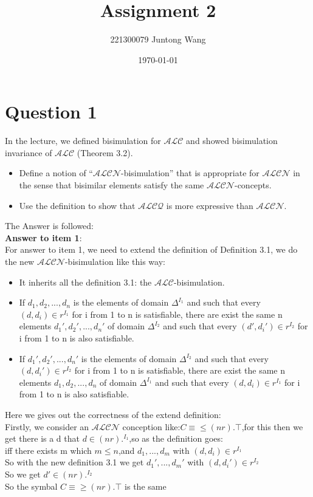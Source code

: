 \documentclass{article}
\title{Assignment 2}
\author{221300079 Juntong Wang}
\date{\today}
\begin{document}
	\maketitle

	\section{Question 1}
    In the lecture, we defined bisimulation for $\mathcal{ALC}$ and showed bisimulation invariance of $\mathcal{ALC}$ (Theorem 3.2).
    \begin{itemize}
        \item Define a notion of ``$\mathcal{ALCN}$-bisimulation'' that is appropriate for $\mathcal{ALCN}$ in the sense that bisimilar elements satisfy the same $\mathcal{ALCN}$-concepts.
        \item Use the definition to show that $\mathcal{ALCQ}$ is more expressive than $\mathcal{ALCN}$.
    \end{itemize}

    The Answer is followed:\\

    \textbf{Answer to item 1}:\\
    For answer to item 1, we need to extend the definition of Definition 3.1, we do the new $\mathcal{ALCN}$-bisimulation like this way:\\
    \begin{itemize}
        \item It inherits all the definition 3.1: the $\mathcal{ALC}$-bisimulation.
        \item If $d_1,d_2,...,d_n$ is the elements of domain $\Delta^{I_1}$ and such that every $(d,d_i) \in r^{I_1}$ for i from 1 to n is satisfiable, there are exist the same n elements $d_1',d_2',...,d_n'$ of domain $\Delta^{I_2}$ and such that every $(d',d_i') \in r^{I_2}$ for i from 1 to n is also satisfiable.
        \item If $d_1',d_2',...,d_n'$ is the elements of domain $\Delta^{I_2}$ and such that every $(d,d_i') \in r^{I_2}$ for i from 1 to n is satisfiable, there are exist the same n elements $d_1,d_2,...,d_n$ of domain $\Delta^{I_1}$ and such that every $(d,d_i) \in r^{I_1}$ for i from 1 to n is also satisfiable.
    \end{itemize}
    Here we gives out the correctness of the extend definition:\\
    Firstly, we consider an $\mathcal{ALCN}$ conception like:$C \equiv \leq(nr).\top$,for this then we get there is a d that $d \in (nr).^{I_1}$,so as the definition goes:\\
    iff there exists m which $m \leq n$,and $d_1, ...,d_m$ with $(d,d_i)\in r^{I_1}$\\
    So with the new definition 3.1 we get $d_1',...,d_m'$ with $(d,d_i')\in r^{I_2}$\\
    So we get $d' \in (nr).^{I_2}$\\
    So the symbal $C\equiv \geq (nr).\top$ is the same\\
\end{document}
